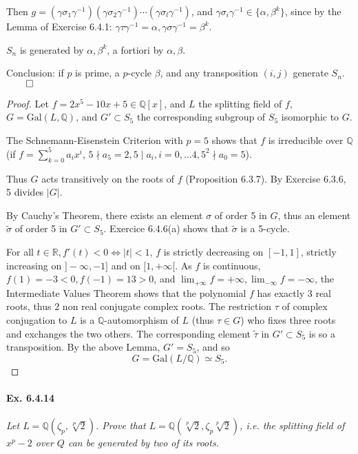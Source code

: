 \documentclass[11pt,a4paper]{article}
\newcommand{\Q}{\mathbb{Q}}
\newcommand{\R}{\mathbb{R}}
\newcommand{\Gal}{\mathrm{Gal}}
\begin{document}
Then $g = (\gamma \sigma_1 \gamma^{-1})(\gamma \sigma_2 \gamma^{-1})\cdots(\gamma \sigma_l \gamma^{-1})$, and $\gamma \sigma_i \gamma^{-1} \in \{ \alpha, \beta^k\}$, since by the Lemma of Exercise 6.4.1: $\gamma \tau \gamma^{-1} = \alpha, \gamma \sigma \gamma^{-1} = \beta^k$.

$S_n$ is generated by $\alpha, \beta^k$, a fortiori by $\alpha, \beta$.

Conclusion: if $p$ is prime, a $p$-cycle $\beta$, and any transposition $(i,j)$ generate $S_n$.
$\qed$

\bigskip 

\begin{proof}
Let $f=2x^5-10x+5 \in \Q[x]$, and $L$ the splitting field of $f$, $G = \Gal(L,\Q)$, and $G' \subset S_5$ the corresponding subgroup of $S_5$ isomorphic to $G$.

The  Schnemann-Eisenstein Criterion with $p=5$ shows that $f$ is irreducible over $\Q$ (if  $f= \sum_{k=0}^5 a_i x^i$, $5\nmid a_5=2, 5\mid a_i, i=0,\ldots 4, 5^2\nmid a_0 = 5$).

Thus $G$ acts transitively on the roots of $f$ (Proposition 6.3.7). By Exercise 6.3.6, 5 divides $ \vert G \vert$.

By Cauchy's Theorem, there exists an element $\sigma$ of order 5 in $G$, thus an element  $\tilde{\sigma}$ of order 5 in $G' \subset S_5$. Exercice 6.4.6(a) shows that $\tilde{\sigma}$ is a 5-cycle.

For all $t \in \R, f'(t) <  0 \iff \vert t \vert < 1$, $f$ is strictly decreasing on $[-1,1]$,  strictly increasing on $]-\infty,-1]$ and on $[1,+\infty[$. As $f$ is continuous, $f(1) = -3<0, f(-1) = 13>0$, and $\lim_{+\infty} f= +\infty, \lim_{-\infty} f= -\infty$, the Intermediate Values Theorem shows that the polynomial $f$ has exactly 3 real roots, thus 2 non real conjugate complex roots. The restriction $\tau$ of complex conjugation to $L$ is a $\Q$-automorphism of $L$ (thus $\tau \in G$) who fixes three roots and exchanges the two others. The corresponding element  $\tilde{\tau}$ in $G' \subset S_5$ is so a transposition. By the above Lemma, $G' = S_5$, and so $$G = \Gal(L/\Q) \simeq S_5.$$
\end{proof}

\paragraph{Ex. 6.4.14}

{\it Let $L = \Q(\zeta_p,\sqrt[P]{2})$.  Prove that $L = \Q(\sqrt[p]{2}, \zeta_p \sqrt[p]{2})$, i.e. the splitting field of $x^p-2$ over $Q$ can be generated by two of its roots.
}
\end{document}
